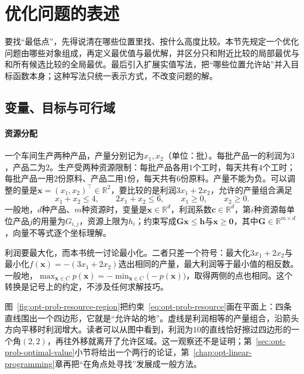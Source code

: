 \section{优化问题的表述}
\label{sec:opt-prob-formulation}

要找“最低点”，先得说清在哪些位置里找、按什么高度比较。本节先规定一个优化问题由哪些对象组成，再定义最优值与最优解，并区分只和附近比较的局部最优与和所有候选比较的全局最优。最后引入扩展实值写法，把“哪些位置允许站”并入目标函数本身；这种写法只统一表示方式，不改变问题的解。

\subsection{变量、目标与可行域}
\label{sec:opt-prob-variables}

\paragraph{资源分配}
一个车间生产两种产品，产量分别记为$x_1,x_2$（单位：批）。每批产品一的利润为$3$，产品二为$2$。生产受两种资源限制：每批产品各用$1$个工时，每天共有$4$个工时；每批产品一用$2$份原料、产品二用$1$份，每天共有$6$份原料。产量不能为负。可以调整的量是$\bm x=(x_1,x_2)^\top\in\mathbb R^2$，要比较的是利润$3x_1+2x_2$，允许的产量组合满足
\begin{equation}
  x_1+x_2\leq4,\qquad 2x_1+x_2\leq6,\qquad x_1\geq0,\qquad x_2\geq0.
  \label{eq:opt-prob-resource}
\end{equation}
一般地，$d$种产品、$m$种资源时，变量是$\bm x\in\mathbb R^d$，利润系数$\bm c\in\mathbb R^d$，第$i$种资源每单位产品$j$的用量为$G_{i,j}$，资源上限为$h_i$；约束写成$\bm G\bm x\leq\bm h$与$\bm x\geq\bm 0$，其中$\bm G\in\mathbb R^{m\times d}$，向量不等式逐个坐标理解。

利润要最大化，而本书统一讨论最小化。二者只差一个符号：最大化$3x_1+2x_2$与最小化$f(\bm x)=-(3x_1+2x_2)$选出相同的产量，最大利润等于最小值的相反数。一般地，$\max_{\bm x\in C}p(\bm x)=-\min_{\bm x\in C}\bigl(-p(\bm x)\bigr)$，取得两侧的点也相同。这个转换是记号上的约定，不涉及任何求解技巧。

图~\ref{fig:opt-prob-resource-region}把约束~\eqref{eq:opt-prob-resource}画在平面上：四条直线围出一个四边形，它就是“允许站的地”。虚线是利润相等的产量组合，沿箭头方向平移时利润增大。读者可以从图中看到，利润为$10$的直线恰好擦过四边形的一个角$(2,2)$，再往外移就离开了允许区域。这一观察还不是证明；第~\ref{sec:opt-prob-optimal-value}小节将给出一个两行的论证，第~\ref{chap:opt-linear-programming}章再把“在角点处寻找”发展成一般方法。

